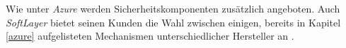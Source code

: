 \documentclass[../main.tex]{subfiles}
\begin{document}
      Wie unter \emph{Azure} werden Sicherheitskomponenten zusätzlich angeboten. Auch \emph{SoftLayer} bietet seinen Kunden die Wahl zwischen einigen, bereits in Kapitel \ref{azure} aufgelisteten Mechanismen unterschiedlicher Hersteller an \cite{softlayerSoftwareSec}.





\end{document}
